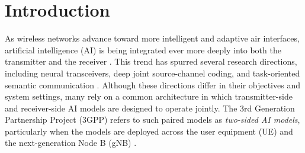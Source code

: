 \documentclass[10pt,twocolumn]{IEEEtran}
\begin{document}
\begin{abstract}
\end{abstract}


\section{Introduction}\label{Sec:Intro}

As wireless networks advance toward more intelligent and adaptive air interfaces, artificial intelligence (AI) is being integrated ever more deeply into both the transmitter and the receiver \cite{11320975}. This trend has spurred several research directions, including neural transceivers, deep joint source-channel coding, and task-oriented semantic communication \cite{11316151,DeepJSCC_Q}. %
Although these directions differ in their objectives and system settings, many rely on a common architecture in which transmitter-side and receiver-side AI models are designed to operate jointly. The 3rd Generation Partnership Project (3GPP) refers to such paired models as \textit{two-sided AI models}, particularly when the models are deployed across the user equipment (UE) and the next-generation Node B (gNB) \cite{3gpp_tr38843_rel19}. 
\end{document}

